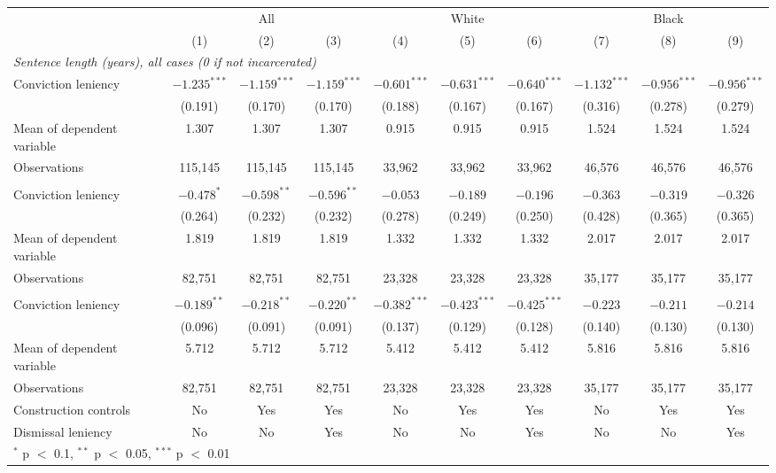 \begin{tabular}{lccccccccc}
\toprule
 & \multicolumn{3}{c}{All} & \multicolumn{3}{c}{White} & \multicolumn{3}{c}{Black} \\
\cmidrule(lr){2-4}\cmidrule(lr){5-7}\cmidrule(lr){8-10}
 & (1) & (2) & (3) & (4) & (5) & (6) & (7) & (8) & (9) \\
\midrule
\multicolumn{10}{l}{\textit{Sentence length (years), all cases (0 if not incarcerated)}} \\
\quad Conviction leniency & $-1.235^{***}$ & $-1.159^{***}$ & $-1.159^{***}$ & $-0.601^{***}$ & $-0.631^{***}$ & $-0.640^{***}$ & $-1.132^{***}$ & $-0.956^{***}$ & $-0.956^{***}$ \\
 & (0.191) & (0.170) & (0.170) & (0.188) & (0.167) & (0.167) & (0.316) & (0.278) & (0.279) \\
\quad Mean of dependent variable & 1.307 & 1.307 & 1.307 & 0.915 & 0.915 & 0.915 & 1.524 & 1.524 & 1.524 \\
\quad Observations & 115,145 & 115,145 & 115,145 & 33,962 & 33,962 & 33,962 & 46,576 & 46,576 & 46,576 \\
\addlinespace
\multicolumn{10}{l}{\textit{Sentence length (years), incarcerated}} \\
\quad Conviction leniency & $-0.478^{*}$ & $-0.598^{**}$ & $-0.596^{**}$ & $-0.053$ & $-0.189$ & $-0.196$ & $-0.363$ & $-0.319$ & $-0.326$ \\
 & (0.264) & (0.232) & (0.232) & (0.278) & (0.249) & (0.250) & (0.428) & (0.365) & (0.365) \\
\quad Mean of dependent variable & 1.819 & 1.819 & 1.819 & 1.332 & 1.332 & 1.332 & 2.017 & 2.017 & 2.017 \\
\quad Observations & 82,751 & 82,751 & 82,751 & 23,328 & 23,328 & 23,328 & 35,177 & 35,177 & 35,177 \\
\addlinespace
\multicolumn{10}{l}{\textit{Log sentence length (days), incarcerated}} \\
\quad Conviction leniency & $-0.189^{**}$ & $-0.218^{**}$ & $-0.220^{**}$ & $-0.382^{***}$ & $-0.423^{***}$ & $-0.425^{***}$ & $-0.223$ & $-0.211$ & $-0.214$ \\
 & (0.096) & (0.091) & (0.091) & (0.137) & (0.129) & (0.128) & (0.140) & (0.130) & (0.130) \\
\quad Mean of dependent variable & 5.712 & 5.712 & 5.712 & 5.412 & 5.412 & 5.412 & 5.816 & 5.816 & 5.816 \\
\quad Observations & 82,751 & 82,751 & 82,751 & 23,328 & 23,328 & 23,328 & 35,177 & 35,177 & 35,177 \\
\midrule
Construction controls & No & Yes & Yes & No & Yes & Yes & No & Yes & Yes \\
Dismissal leniency & No & No & Yes & No & No & Yes & No & No & Yes \\
\bottomrule
\multicolumn{10}{l}{\footnotesize $^{*}$ p $<$ 0.1, $^{**}$ p $<$ 0.05, $^{***}$ p $<$ 0.01} \\
\end{tabular}

